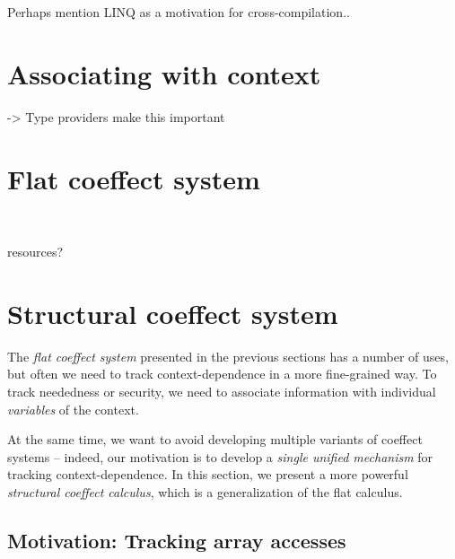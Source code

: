 Perhaps mention LINQ as a motivation for cross-compilation..
\cite{app-linq}


\section{Associating with context}

-> Type providers make this important


\section{Flat coeffect system}
~

resources?


\section{Structural coeffect system}
\label{sec:structural}

The \emph{flat coeffect system} presented in the previous sections has a number of uses, but often
we need to track context-dependence in a more fine-grained way. To track neededness or security, 
we need to associate information with individual \emph{variables} of the context. 

At the same time, we want to avoid developing multiple variants of coeffect systems -- indeed, 
our motivation is to develop a \emph{single unified mechanism} for tracking context-dependence.
In this section, we present a more powerful \emph{structural coeffect calculus}, which is a 
generalization of the flat calculus. 



\subsection{Motivation: Tracking array accesses}
\label{sec:structural-motivation}
\newcommand{\pastval}[2]{\ident{#1}_{[#2]}}
\newcommand{\dnat}{\ident{D}_\ident{nat}}
\newcommand{\cprd}{\times}
\newcommand{\cvop}{~\ident{max}~}

